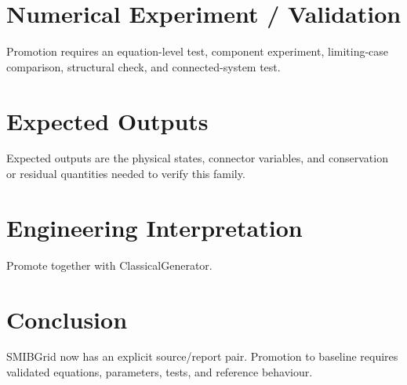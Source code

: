 \documentclass[10pt,a4paper]{article}
\begin{document}
\section{Numerical Experiment / Validation}Promotion requires an equation-level test, component experiment, limiting-case comparison, structural check, and connected-system test.
\section{Expected Outputs}Expected outputs are the physical states, connector variables, and conservation or residual quantities needed to verify this family.
\section{Engineering Interpretation}Promote together with ClassicalGenerator.
\section*{Conclusion}SMIBGrid now has an explicit source/report pair. Promotion to baseline requires validated equations, parameters, tests, and reference behaviour.
\end{document}
